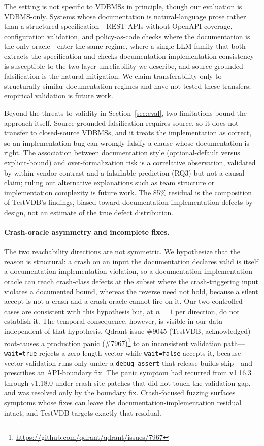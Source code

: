 \documentclass[sigconf]{acmart}
\begin{document}
The setting is not specific to VDBMSs in principle, though our evaluation is VDBMS-only. Systems whose documentation is natural-language prose rather than a structured specification---REST APIs without OpenAPI coverage, configuration validation, and policy-as-code checks where the documentation is the only oracle---enter the same regime, where a single LLM family that both extracts the specification and checks documentation-implementation consistency is susceptible to the two-layer unreliability we describe, and source-grounded falsification is the natural mitigation. We claim transferability only to structurally similar documentation regimes and have not tested these transfers; empirical validation is future work.

Beyond the threats to validity in Section~\ref{sec:eval}, two limitations bound the approach itself. Source-grounded falsification requires source, so it does not transfer to closed-source VDBMSs, and it treats the implementation as correct, so an implementation bug can wrongly falsify a clause whose documentation is right. The association between documentation style (optional-default versus explicit-bound) and over-formalization risk is a correlative observation, validated by within-vendor contrast and a falsifiable prediction (RQ3) but not a causal claim; ruling out alternative explanations such as team structure or implementation complexity is future work. The 85\% residual is the composition of TestVDB's findings, biased toward documentation-implementation defects by design, not an estimate of the true defect distribution.

\paragraph{Crash-oracle asymmetry and incomplete fixes.} The two reachability directions are not symmetric. We hypothesize that the reason is structural: a crash on an input the documentation declares valid is itself a documentation-implementation violation, so a documentation-implementation oracle can reach crash-class defects at the subset where the crash-triggering input violates a documented bound, whereas the reverse need not hold, because a silent accept is not a crash and a crash oracle cannot fire on it. Our two controlled cases are consistent with this hypothesis but, at $n{=}1$ per direction, do not establish it. The temporal consequence, however, is visible in our data independent of that hypothesis. Qdrant issue \#9045 (TestVDB, acknowledged) root-causes a production panic (\#7967)\footnote{\url{https://github.com/qdrant/qdrant/issues/7967}} to an inconsistent validation path---\texttt{wait=true} rejects a zero-length vector while \texttt{wait=false} accepts it, because vector validation runs only under a \texttt{debug\_assert} that release builds skip---and prescribes an API-boundary fix. The panic symptom had recurred from v1.16.3 through v1.18.0 under crash-site patches that did not touch the validation gap, and was resolved only by the boundary fix. Crash-focused fuzzing surfaces symptoms whose fixes can leave the documentation-implementation residual intact, and TestVDB targets exactly that residual.
\end{document}
